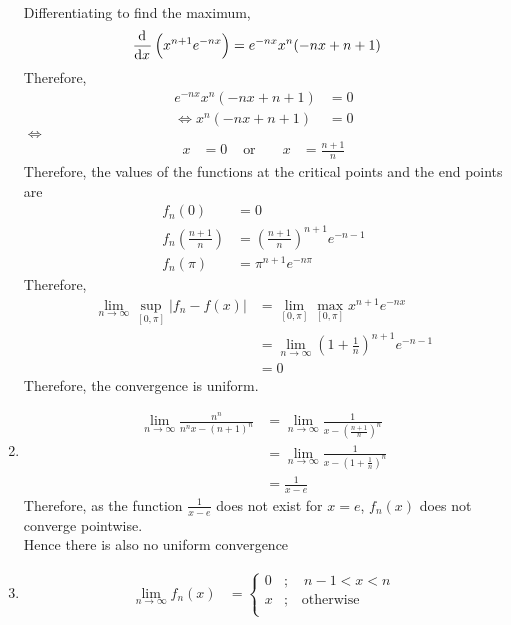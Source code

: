 \documentclass[fleqn, a4paper, 12pt, oneside]{amsart}
\theoremstyle{definition}
\theoremstyle{theorem}
\begin{document}
\begin{solution}
\begin{enumerate}[leftmargin = *]
\begin{align*}
			\end{align*}
			Differentiating to find the maximum,
			\begin{align*}
				\dod{}{x} \left( x^{n + 1} e^{-n x} \right) &= e^{-n x} x^n (-n x + n + 1)
			\end{align*}
			Therefore,
			\begin{align*}
				e^{-n x} x^n (-n x + n + 1) &= 0\\
				\iff x^n (-n x + n + 1) &= 0
			\end{align*}
			$\iff$
			\begin{align*}
				x &=0 &\text{ or }&& x &= \frac{n + 1}{n}
			\end{align*}
			Therefore, the values of the functions at the critical points and the end points are
			\begin{align*}
				f_n(0) &= 0\\
				f_n\left( \frac{n + 1}{n} \right) &= \left( \frac{n + 1}{n} \right)^{n + 1} e^{-n - 1}\\
				f_n(\pi) &= \pi^{n + 1} e^{-n \pi}
			\end{align*}
			Therefore,
			\begin{align*}
				\lim\limits_{n \to \infty} \sup\limits_{[0,\pi]} |f_n - f(x)| &= \lim\limits_{[0,\pi]} \max\limits_{[0,\pi]} x^{n + 1} e^{-n x}\\
				&= \lim\limits_{n \to \infty} \left( 1 + \frac{1}{n} \right)^{n + 1} e^{-n - 1}\\
				&= 0
			\end{align*}
			Therefore, the convergence is uniform.
		\item
			\begin{align*}
				\lim\limits_{n \to \infty} \frac{n^n}{n^n x - (n + 1)^n} &= \lim\limits_{n \to \infty} \frac{1}{x - \left( \frac{n + 1}{n} \right)^n}\\
				&= \lim\limits_{n \to \infty} \frac{1}{x - \left( 1 + \frac{1}{n} \right)^n}\\
				&= \frac{1}{x - e}
			\end{align*}
			Therefore, as the function $\frac{1}{x - e}$ does not exist for $x = e$, $f_n(x)$ does not converge pointwise.\\
			Hence there is also no uniform convergence
		\item
			\begin{align*}
				\lim\limits_{n \to \infty} f_n(x) &=
					\begin{cases}
						0 &;\quad n - 1 < x < n\\
						x &;\quad \text{otherwise}\\

\end{cases}
\end{align*}
\end{enumerate}
\end{solution}
\end{document}
